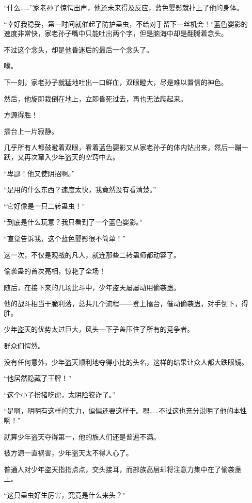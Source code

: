 \begin{this_body}
“什么……”家老孙子惊愕出声，他还未来得及反应，蓝色婴影就扑上了他的身体。

“幸好我稳妥，第一时间就催起了防护蛊虫，不给对手留下一丝机会！”蓝色婴影的速度非常快，家老孙子嘴中只能吐出两个字，但是脑海中却是翻腾着念头。

不过这个念头，却是他昏迷后的最后一个念头了。

噗。

下一刻，家老孙子就猛地吐出一口鲜血，双眼瞪大，尽是难以置信的神色。

然后，他旋即栽倒在地上，立即昏死过去，再也无法爬起来。

方源得胜！

擂台上一片寂静。

几乎所有人都鼓瞪着双眼，看着蓝色婴影又从家老孙子的体内钻出来，然后一蹦一跃，又再次窜入少年盗天的空窍中去。

“卑鄙！他又使阴招啊。”

“是用的什么东西？速度太快，我竟然没有看清楚。”

“它好像是一只二转蛊虫！”

“到底是什么玩意？我只看到了一个蓝色婴影。”

“直觉告诉我，这个蓝色婴影很不简单！”

这一次，不仅是观战的凡人，就连那些二转蛊师都动容了。

偷袭蛊的首次亮相，惊艳了全场！

随后，在接下来的几场比斗中，少年盗天屡屡动用偷袭蛊。

他的战斗相当干脆利落，总共几个流程——登上擂台，催动偷袭蛊，对手倒下，得胜。

少年盗天的优势太过巨大，风头一下子盖压住了所有的竞争者。

群众们愕然。

没有任何意外，少年盗天顺利地夺得小比的头名，这样的结果让众人都大跌眼镜。

“他居然隐藏了王牌！”

“这个小子扮猪吃虎，太阴险狡诈了。”

“是啊，明明有这样的实力，偏偏还要这样干。嗯……不过这也充分说明了他的本性啊！”

就算少年盗天夺得第一，他的族人们还是普遍不满。

被方源一直祸害，少年盗天太不得人心了。

普通人对少年盗天指指点点，交头接耳，而部族高层却将注意力集中在了偷袭蛊上。

“这只蛊虫好生厉害，究竟是什么来头？”


\end{this_body}
